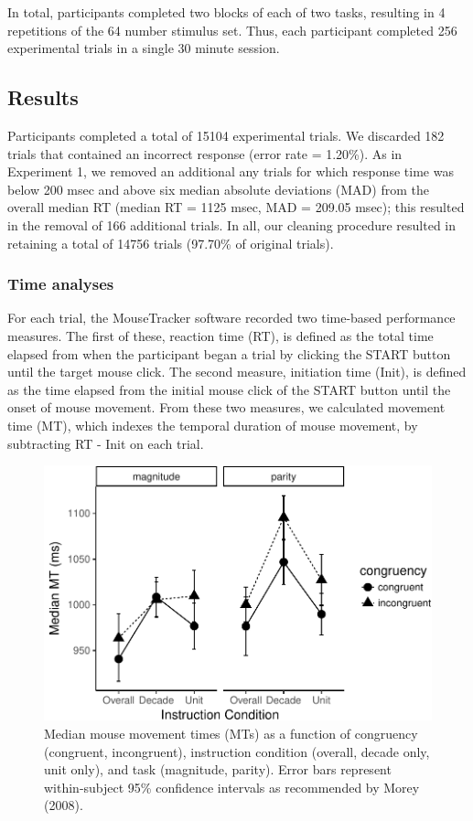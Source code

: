 \documentclass[english,man]{apa6}
\theoremstyle{definition}
\theoremstyle{definition}
\theoremstyle{definition}
\theoremstyle{remark}
\begin{document}
In total, participants completed two blocks of each of two tasks,
resulting in 4 repetitions of the 64 number stimulus set. Thus, each
participant completed 256 experimental trials in a single 30 minute
session.

\subsection{Results}\label{results-1}

Participants completed a total of 15104 experimental trials. We
discarded 182 trials that contained an incorrect response (error rate =
1.20\%). As in Experiment 1, we removed an additional any trials for
which response time was below 200 msec and above six median absolute
deviations (MAD) from the overall median RT (median RT = 1125 msec, MAD
= 209.05 msec); this resulted in the removal of 166 additional trials.
In all, our cleaning procedure resulted in retaining a total of 14756
trials (97.70\% of original trials).

\subsubsection{Time analyses}\label{time-analyses}

For each trial, the MouseTracker software recorded two time-based
performance measures. The first of these, reaction time (RT), is defined
as the total time elapsed from when the participant began a trial by
clicking the START button until the target mouse click. The second
measure, initiation time (Init), is defined as the time elapsed from the
initial mouse click of the START button until the onset of mouse
movement. From these two measures, we calculated movement time (MT),
which indexes the temporal duration of mouse movement, by subtracting RT
- Init on each trial.

\begin{figure}
\centering
\includegraphics{paper_files/figure-latex/exp2-mt-1.pdf}
\caption{\label{fig:exp2-mt}Median mouse movement times (MTs) as a function
of congruency (congruent, incongruent), instruction condition (overall,
decade only, unit only), and task (magnitude, parity). Error bars
represent within-subject 95\% confidence intervals as recommended by
Morey (2008).}
\end{figure}
\end{document}
